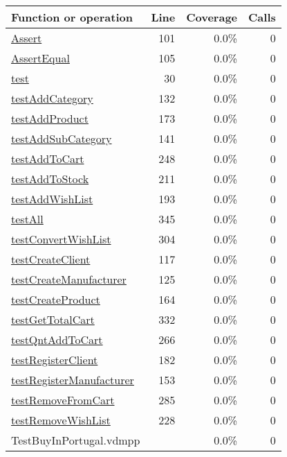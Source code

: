 \begin{longtable}{|l|r|r|r|}
\hline
Function or operation & Line & Coverage & Calls \\
\hline
\hline
\hyperref[Assert:101]{Assert} & 101&0.0\% & 0 \\
\hline
\hyperref[AssertEqual:105]{AssertEqual} & 105&0.0\% & 0 \\
\hline
\hyperref[test:30]{test} & 30&0.0\% & 0 \\
\hline
\hyperref[testAddCategory:132]{testAddCategory} & 132&0.0\% & 0 \\
\hline
\hyperref[testAddProduct:173]{testAddProduct} & 173&0.0\% & 0 \\
\hline
\hyperref[testAddSubCategory:141]{testAddSubCategory} & 141&0.0\% & 0 \\
\hline
\hyperref[testAddToCart:248]{testAddToCart} & 248&0.0\% & 0 \\
\hline
\hyperref[testAddToStock:211]{testAddToStock} & 211&0.0\% & 0 \\
\hline
\hyperref[testAddWishList:193]{testAddWishList} & 193&0.0\% & 0 \\
\hline
\hyperref[testAll:345]{testAll} & 345&0.0\% & 0 \\
\hline
\hyperref[testConvertWishList:304]{testConvertWishList} & 304&0.0\% & 0 \\
\hline
\hyperref[testCreateClient:117]{testCreateClient} & 117&0.0\% & 0 \\
\hline
\hyperref[testCreateManufacturer:125]{testCreateManufacturer} & 125&0.0\% & 0 \\
\hline
\hyperref[testCreateProduct:164]{testCreateProduct} & 164&0.0\% & 0 \\
\hline
\hyperref[testGetTotalCart:332]{testGetTotalCart} & 332&0.0\% & 0 \\
\hline
\hyperref[testQntAddToCart:266]{testQntAddToCart} & 266&0.0\% & 0 \\
\hline
\hyperref[testRegisterClient:182]{testRegisterClient} & 182&0.0\% & 0 \\
\hline
\hyperref[testRegisterManufacturer:153]{testRegisterManufacturer} & 153&0.0\% & 0 \\
\hline
\hyperref[testRemoveFromCart:285]{testRemoveFromCart} & 285&0.0\% & 0 \\
\hline
\hyperref[testRemoveWishList:228]{testRemoveWishList} & 228&0.0\% & 0 \\
\hline
\hline
TestBuyInPortugal.vdmpp & & 0.0\% & 0 \\
\hline
\end{longtable}

